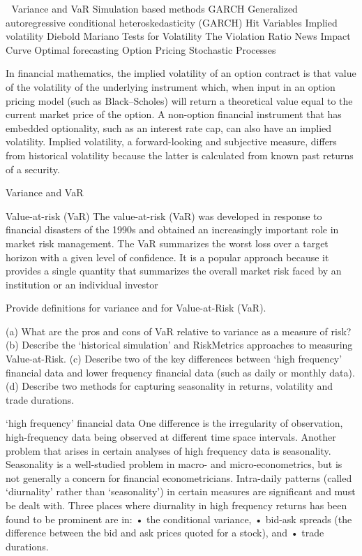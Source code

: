 

Variance and VaR
Simulation based methods
GARCH
Generalized autoregressive conditional heteroskedasticity (GARCH)
Hit Variables
Implied volatility
Diebold Mariano Tests for Volatility
The Violation Ratio
News Impact Curve
Optimal forecasting
Option Pricing
Stochastic Processes

In financial mathematics, the implied volatility of an option contract is that value of the volatility of the underlying instrument which, when input in an option pricing model (such as Black–Scholes) will return a theoretical value equal to the current market price of the option. A non-option financial instrument that has embedded optionality, such as an interest rate cap, can also have an implied volatility. Implied volatility, a forward-looking and subjective measure, differs from historical volatility because the latter is calculated from known past returns of a security.



Variance and VaR

Value-at-risk (VaR)
The value-at-risk (VaR) was developed in response to ﬁnancial disasters of the 1990s and obtained an increasingly important role in market risk management.
The VaR summarizes the worst loss over a target horizon with a given level of conﬁdence. It is a popular approach because it provides a single quantity that summarizes the overall market risk faced by an institution or an individual investor

Provide deﬁnitions for variance and for Value-at-Risk (VaR).

(a) What are the pros and cons of VaR relative to variance as a measure of risk?
(b) Describe the ‘historical simulation’ and RiskMetrics approaches to measuring Value-at-Risk.
(c) Describe two of the key diﬀerences between ‘high frequency’ ﬁnancial data and lower frequency ﬁnancial data (such as daily or monthly data).
(d) Describe two methods for capturing seasonality in returns, volatility and trade durations.


‘high frequency’ ﬁnancial data 
One diﬀerence is the irregularity of observation, high-frequency data being observed at diﬀerent time space intervals. Another problem that arises in certain analyses of high frequency data is seasonality. 
Seasonality is a well-studied problem in macro- and micro-econometrics, but is not generally a concern for ﬁnancial econometricians. 
Intra-daily patterns (called ‘diurnality’ rather than ‘seasonality’) in certain measures are signiﬁcant and must be dealt with. 
Three places where diurnality in high frequency returns has been found to be prominent are in:
• the conditional variance,
• bid-ask spreads (the diﬀerence between the bid and ask prices quoted for a stock), and
• trade durations.



